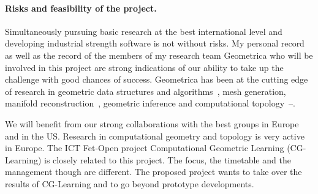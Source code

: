 \paragraph{Risks and feasibility of the project.} 
Simultaneously pursuing basic research at the best international level and developing industrial strength software is not without risks. %
My personal record as well as the record of the members of my research team  Geometrica who will be involved in this project are strong indications of our ability to take up the challenge with good chances of success.  Geometrica has been at the cutting edge of research in geometric data structures and algorithms~\cite{by-ag-98,geometrica-ecg-book}, mesh generation, manifold reconstruction~\cite{geometrica-7142i,geometrica-bgo-09}, geometric inference and computational topology~\cite{geometrica-ccl09}--\cite{geometrica-cseh-07}. %


We will benefit from our strong collaborations with the best groups in Europe and in the US.
Research in computational geometry and topology is very active in  Europe.  The ICT Fet-Open project Computational Geometric Learning (CG-Learning) is closely related to this project. The focus, the timetable and the management though are different. The proposed project wants to take over the results of CG-Learning and to go beyond prototype developments.  %




